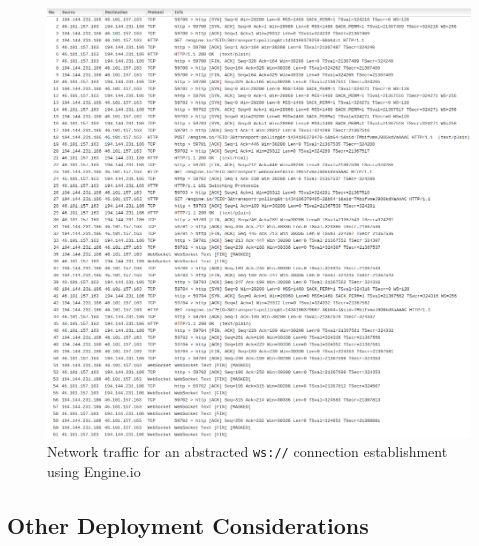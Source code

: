 \newpage
\begin{figure}[h!]
	\centering
	\includegraphics[width=1\textwidth]{images/engineio_dump}
	\caption{Network traffic for an abstracted \texttt{ws://} connection establishment using Engine.io}
	\label{fig:engineioTraffic}
\end{figure}

\subsection{Other Deployment Considerations}

